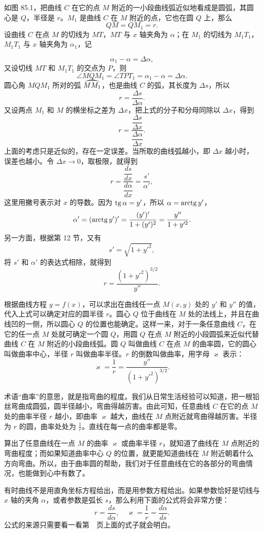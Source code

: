 \hfill
\begin{minipage}[t]{0.53\textwidth}
  \vspace{0pt}
  \hspace{2em}如图 85.1，把曲线 $C$ 在它的点 $M$ 附近的一小段曲线弧近似地看成是圆弧，其圆心是 $Q$，半径是 $r$。$M_1$ 是曲线 $C$ 在 $M$ 附近的点，它也在圆 $Q$ 上，那么
  \[
    QM = QM_1 = r.
  \]
  设曲线 $C$ 在点 $M$ 的切线为 $MT$，$MT$ 与 $x$ 轴夹角为 $\alpha$；在 $M_1$ 的切线为 $M_1 T_1$，$M_1 T_1$ 与 $x$ 轴夹角为 $\alpha_1$，记
\end{minipage}

\[
  \alpha_1 - \alpha = \Delta\alpha,
\]
又设切线 $MT$ 和 $M_1 T_1$ 的交点为 $P$，则
\[
  \angle MQM_1 = \angle TPT_1 = \alpha_1 - \alpha = \Delta\alpha.
\]
圆心角 $MQM_1$ 所对的弧 $\arc{MM_1}$，也是曲线 $C$ 的弧，其长度为 $\Delta s$，所以
\[
  r = \frac{\Delta s}{\Delta\alpha}.
\]
又设两点 $M_1$ 和 $M$ 的横坐标之差为 $\Delta x$，把上式的分子和分母同除以 $\Delta x$，得到
\[
  r = \frac{\dfrac{\Delta s}{\Delta x}}{\dfrac{\Delta\alpha}{\Delta x}}.
\]
上面的考虑只是近似的，存在一定误差。当所取的曲线弧越小，即 $\Delta x$ 越小时，误差也越小。令 $\Delta x \to 0$，取极限，就得到
\label{eq:sec85_r}%
\[
  r = \frac{\dfrac{ds}{dx}}{\dfrac{d\alpha}{dx}} = \frac{s'}{\alpha'},
\]
这里用撇号表示对 $x$ 的导数。因为 $\operatorname{tg}\alpha = y'$，所以 $\alpha = \operatorname{arctg} y'$，
\[
  \alpha' = (\operatorname{arctg} y')' = \frac{(y')'}{1 + (y')^2} = \frac{y''}{1 + y'^2}.
\]
另一方面，根据第 12 节，又有
\[
  s' = \sqrt{1 + y'^2},
\]
将 $s'$ 和 $\alpha'$ 的表达式相除，就得到
\[
  r = \frac{(1 + y'^2)^{3/2}}{y''}.
\]

根据曲线方程 $y = f(x)$，可以求出在曲线任一点 $M(x, y)$ 处的 $y'$ 和 $y''$ 的值，代入上式可以确定对应的圆半径 $r$。圆心 $Q$ 位于曲线在 $M$ 处的法线上，并且在曲线凹的一侧，所以圆心 $Q$ 的位置也能确定。这样一来，对于一条任意曲线 $C$，在它的任一点 $M$ 处就可确定一个圆 $Q$，用圆 $Q$ 在点 $M$ 附近的小段圆弧来近似代替曲线 $C$ 在 $M$ 附近的小段曲线弧。圆 $Q$ 叫做曲线 $C$ 在点 $M$ 的曲率圆，它的圆心叫做曲率中心，半径 $r$ 叫做曲率半径。$r$ 的倒数叫做曲率，用字母 $\varkappa$ 表示：
\[
  \varkappa = \frac{1}{r} = \frac{y''}{(1 + y'^2)^{3/2}}.
\]

术语“曲率”的意思，就是指弯曲的程度。我们从日常生活经验可以知道，把一根铅丝弯曲成圆弧，圆半径越小，弯曲得越厉害。由此可知，任意曲线 $C$ 在它的点 $M$ 处的曲率半径 $r$ 越小，即曲率 $\varkappa$ 越大，曲线在 $M$ 点附近就弯曲得越厉害。半径为 $r$ 的圆，曲率处处为 $\frac{1}{r}$。直线在每一点的曲率都是零。

算出了任意曲线在一点 $M$ 的曲率 $\varkappa$ 或曲率半径 $r$，就知道了曲线在 $M$ 点附近的弯曲程度；而如果知道曲率中心 $Q$ 的位置，就更能知道曲线在 $M$ 附近朝着什么方向弯曲。所以，由于曲率圆的帮助，我们对于任意曲线在它的各部分的弯曲情况，也能做到心中有数了。

有时曲线不是用直角坐标方程给出，而是用参数方程给出。如果参数恰好是切线与 $x$ 轴的夹角 $\alpha$，或者参数是弧长 $s$，那么利用下面的公式将会非常方便：
\[
  r = \frac{ds}{d\alpha}, \quad \varkappa = \frac{1}{r} = \frac{d\alpha}{ds}.
\]
公式的来源只需要看一看第~\pageref{eq:sec85_r}~页上面的式子就会明白。%
